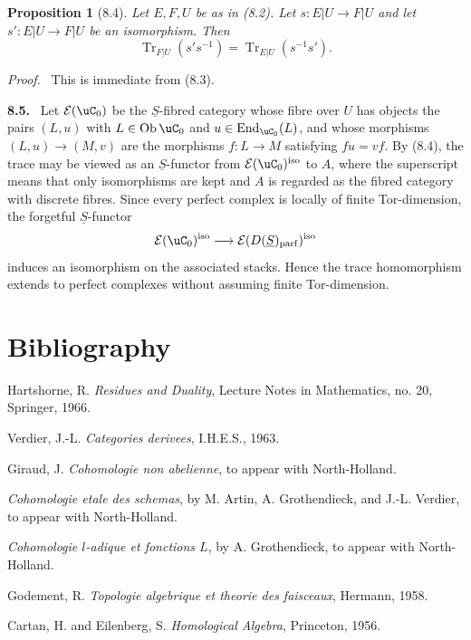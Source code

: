 \documentclass[11pt]{article}
\theoremstyle{plain}
\newtheorem*{proposition*}{Proposition}
\theoremstyle{definition}
\theoremstyle{remark}
\newenvironment{statement}[1]{\par\medskip\noindent\textbf{#1.}\ }{\par\medskip}
\newenvironment{prooftext}{\par\noindent\textit{Proof.}\ }{\par\medskip}
\DeclareMathOperator{\End}{End}
\DeclareMathOperator{\ob}{Ob}
\DeclareMathOperator{\Tr}{Tr}
\providecommand{\uS}{\underline{S}}
\begin{document}
\begin{proposition*}[8.4]
Let $E,F,U$ be as in (8.2). Let $s:E|U\to F|U$ and let $s':E|U\to F|U$ be an isomorphism. Then
\[
\Tr_{F|U}(s's^{-1})=
\Tr_{E|U}(s^{-1}s').
\]
\end{proposition*}

\begin{prooftext}
This is immediate from (8.3).
\end{prooftext}

\begin{statement}{8.5}
Let $\mathcal E(\uC_0)$ be the $\uS$-fibred category whose fibre over $U$ has objects the pairs $(L,u)$ with $L\in\ob\uC_0$ and $u\in\End_{\uC_0}(L)$, and whose morphisms $(L,u)\to(M,v)$ are the morphisms $f:L\to M$ satisfying $fu=vf$. By (8.4), the trace may be viewed as an $\uS$-functor from $\mathcal E(\uC_0)^{\mathrm{iso}}$ to $A$, where the superscript means that only isomorphisms are kept and $A$ is regarded as the fibred category with discrete fibres. Since every perfect complex is locally of finite Tor-dimension, the forgetful $\uS$-functor
\[
\mathcal E(\uC_0)^{\mathrm{iso}}
\longrightarrow
\mathcal E(D(\uS)_{\mathrm{parf}})^{\mathrm{iso}}
\]
induces an isomorphism on the associated stacks. Hence the trace homomorphism extends to perfect complexes without assuming finite Tor-dimension.
\end{statement}

\section*{Bibliography}
\begin{enumerate}[label={[\Alph*]}]
\item Hartshorne, R. \emph{Residues and Duality}, Lecture Notes in Mathematics, no. 20, Springer, 1966.
\item Verdier, J.-L. \emph{Categories derivees}, I.H.E.S., 1963.
\item Giraud, J. \emph{Cohomologie non abelienne}, to appear with North-Holland.
\item \emph{Cohomologie etale des schemas}, by M. Artin, A. Grothendieck, and J.-L. Verdier, to appear with North-Holland.
\item \emph{Cohomologie $l$-adique et fonctions $L$}, by A. Grothendieck, to appear with North-Holland.
\item Godement, R. \emph{Topologie algebrique et theorie des faisceaux}, Hermann, 1958.
\item Cartan, H. and Eilenberg, S. \emph{Homological Algebra}, Princeton, 1956.
\end{enumerate}
\end{document}
